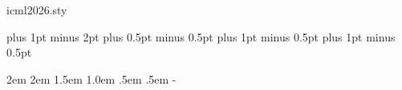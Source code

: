 \begin{filecontents*}[overwrite]{icml2026.sty}
\def\thesection {\arabic{section}}
\def\thesubsection {\thesection.\arabic{subsection}}
\def\section{\@startsection{section}{1}{\z@}{-0.12in}{0.02in}
  {\large\bf\raggedright}}
\def\subsection{\@startsection{subsection}{2}{\z@}{-0.10in}{0.01in}
  {\normalsize\bf\raggedright}}
\def\subsubsection{\@startsection{subsubsection}{3}{\z@}{-0.08in}{0.01in}
  {\normalsize\sc\raggedright}}
\def\paragraph{\@startsection{paragraph}{4}{\z@}{1.5ex plus
    0.5ex minus .2ex}{-1em}{\normalsize\bf}}
\def\subparagraph{\@startsection{subparagraph}{5}{\z@}{1.5ex plus
    0.5ex minus .2ex}{-1em}{\normalsize\bf}}

\footnotesep 6.65pt %
\skip\footins 9pt
\def\footnoterule{\kern-3pt \hrule width 0.8in \kern 2.6pt }
\setcounter{footnote}{0}

\parindent 0pt
\topsep 4pt plus 1pt minus 2pt
\partopsep 1pt plus 0.5pt minus 0.5pt
\itemsep 2pt plus 1pt minus 0.5pt
\parsep 2pt plus 1pt minus 0.5pt
\parskip 6pt

\leftmargin 2em \leftmargini\leftmargin \leftmarginii 2em
\leftmarginiii 1.5em \leftmarginiv 1.0em \leftmarginv .5em
\leftmarginvi .5em
\leftmargini\advance{}- {}

\def\@listi{\leftmargin\leftmargini}
\def\@listii{\leftmargin\leftmarginii
  \labelwidth\leftmarginii\advance\labelwidth-\labelsep
  \topsep 2pt plus 1pt minus 0.5pt
  \parsep 1pt plus 0.5pt minus 0.5pt
  \itemsep \parsep}
\def\@listiii{\leftmargin\leftmarginiii
  \labelwidth\leftmarginiii\advance\labelwidth-\labelsep
  \topsep 1pt plus 0.5pt minus 0.5pt
  \parsep \z@ \partopsep 0.5pt plus 0pt minus 0.5pt
  \itemsep \topsep}
\def\@listiv{\leftmargin\leftmarginiv
  \labelwidth\leftmarginiv\advance\labelwidth-\labelsep}
\def\@listv{\leftmargin\leftmarginv
  \labelwidth\leftmarginv\advance\labelwidth-\labelsep}
\def\@listvi{\leftmargin\leftmarginvi
  \labelwidth\leftmarginvi\advance\labelwidth-\labelsep}


\end{filecontents*}
